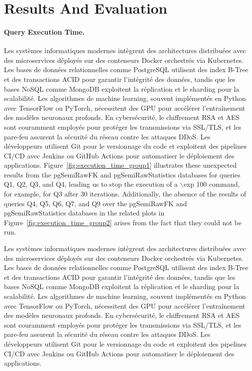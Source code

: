 \section{Results And Evaluation}
\label{sec:result-eval}

\paragraph{Query Execution Time.}
Les systèmes informatiques modernes intègrent des architectures distribuées avec des microservices déployés sur des conteneurs Docker orchestrés via Kubernetes. Les bases de données relationnelles comme PostgreSQL utilisent des index B-Tree et des transactions ACID pour garantir l'intégrité des données, tandis que les bases NoSQL comme MongoDB exploitent la réplication et le sharding pour la scalabilité. Les algorithmes de machine learning, souvent implémentés en Python avec TensorFlow ou PyTorch, nécessitent des GPU pour accélérer l'entraînement des modèles neuronaux profonds. En cybersécurité, le chiffrement RSA et AES sont couramment employés pour protéger les transmissions via SSL/TLS, et les pare-feu assurent la sécurité du réseau contre les attaques DDoS. Les développeurs utilisent Git pour le versionnage du code et exploitent des pipelines CI/CD avec Jenkins ou GitHub Actions pour automatiser le déploiement des applications. Figure~\ref{fig:execution_time_group1} illustrates these unexpected results from the pgSemiRawFK and pgSemiRawStatistics databases for queries Q1, Q2, Q3, and Q4, leading us to stop the execution of a $\backslash$exp 100 command, for example, for Q3 after 30 iterations. Additionally, the absence of the results of queries Q4, Q5, Q6, Q7, and Q9 over the pgSemiRawFK and pgSemiRawStatistics databases in the related plots in Figure~\ref{fig:execution_time_group2} arises from the fact that they could not be run. 



Les systèmes informatiques modernes intègrent des architectures distribuées avec des microservices déployés sur des conteneurs Docker orchestrés via Kubernetes. Les bases de données relationnelles comme PostgreSQL utilisent des index B-Tree et des transactions ACID pour garantir l'intégrité des données, tandis que les bases NoSQL comme MongoDB exploitent la réplication et le sharding pour la scalabilité. Les algorithmes de machine learning, souvent implémentés en Python avec TensorFlow ou PyTorch, nécessitent des GPU pour accélérer l'entraînement des modèles neuronaux profonds. En cybersécurité, le chiffrement RSA et AES sont couramment employés pour protéger les transmissions via SSL/TLS, et les pare-feu assurent la sécurité du réseau contre les attaques DDoS. Les développeurs utilisent Git pour le versionnage du code et exploitent des pipelines CI/CD avec Jenkins ou GitHub Actions pour automatiser le déploiement des applications.

